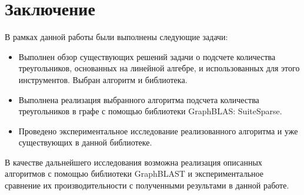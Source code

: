 \documentclass[14pt]{matmex-diploma}
\begin{document}
 \clearpage \section{Заключение}
В рамках данной работы были выполнены следующие задачи:
\begin{itemize}
    \item Выполнен обзор существующих решений задачи о подсчете количества треугольников, основанных на линейной алгебре, и использованных для этого инструментов. Выбран алгоритм и библиотека.
    \item Выполнена реализация выбранного алгоритма подсчета количества треугольников в графе с помощью библиотеки GraphBLAS: SuiteSparse.
    \item Проведено экспериментальное исследование реализованного алгоритма и уже существующих в данной библиотеке.
\end{itemize}

В качестве дальнейшего исследования возможна реализация описанных алгоритмов с помощью библиотеки GraphBLAST и экспериментальное сравнение их производительности с полученными результами в данной работе.
\setmonofont[Mapping=tex-text]{CMU Typewriter Text}


\end{document}
